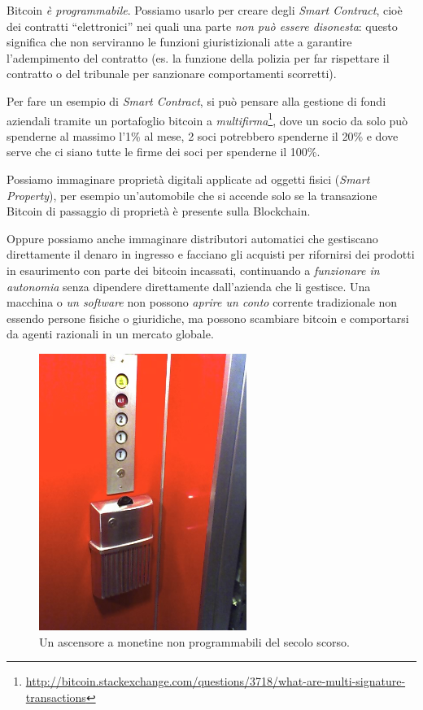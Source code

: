 \documentclass[a4paper,12pt,italian]{article}
\newcommand{\longurl}[1]{%
\href{#1}{\ttfamily \smaller #1}%
}%
\begin{document}
\bigskip

Bitcoin \emph{è programmabile}. Possiamo usarlo per creare degli \emph{Smart
Contract}, cioè dei contratti ``elettronici'' nei quali una parte \emph{non può essere
disonesta}: questo significa che non serviranno le funzioni
giuristizionali atte a garantire l’adempimento del contratto (es. la
funzione della polizia per far rispettare il contratto o del tribunale
per sanzionare comportamenti scorretti).

\bigskip

Per fare un esempio di \emph{Smart Contract}, si può pensare alla gestione di fondi aziendali
tramite un portafoglio bitcoin a \emph{multifirma}\footnote{\longurl{http://bitcoin.stackexchange.com/questions/3718/what-are-multi-signature-transactions}}, 
dove un socio da solo può spenderne al
massimo l’1\% al mese, 2 soci potrebbero spenderne il 20\% e dove serve che ci siano
tutte le firme dei soci per spenderne il 100\%.


\bigskip

Possiamo immaginare proprietà digitali applicate ad oggetti
fisici (\emph{Smart Property}), per esempio un’automobile che si accende solo
se la transazione Bitcoin di passaggio di proprietà è presente sulla
Blockchain.


\bigskip

Oppure possiamo anche immaginare distributori automatici che gestiscano direttamente
il denaro in ingresso e facciano gli acquisti per rifornirsi dei
prodotti in esaurimento con parte dei bitcoin incassati, continuando a
\emph{funzionare in autonomia} senza dipendere direttamente dall’azienda che
li gestisce. Una macchina o \emph{un software} non possono \emph{aprire un conto}
corrente tradizionale non essendo persone fisiche o giuridiche, ma
possono scambiare bitcoin e comportarsi da agenti razionali in un
mercato globale.

\begin{figure}
\centering
\includegraphics[height=9cm]{figures/elevator.jpg}
\caption{Un ascensore a monetine non programmabili del secolo scorso.}
\end{figure}
\end{document}
